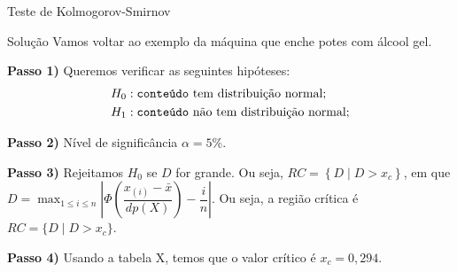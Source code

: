\documentclass[10pt]{beamer}
\begin{document}
%
%

\begin{frame}{Teste de Kolmogorov-Smirnov}

\begin{block}{Solução}
Vamos voltar ao exemplo da máquina que enche potes com álcool gel. 
	
	\textbf{Passo 1)} Queremos verificar as seguintes hipóteses:
	\begin{align*}
		&H_0: \mbox{\texttt{conteúdo} tem distribuição normal};\\
		&H_1: \mbox{\texttt{conteúdo} não tem distribuição normal};
	\end{align*}
	
	\textbf{Passo 2)} Nível de significância $\alpha = 5\%$.
	
	\textbf{Passo 3)} Rejeitamos $H_0$ se $D$ for grande. Ou seja, $RC = \left\{ D \mid D > x_c \right\}$, em que $D = \max_{1 \leq i \leq n} \left\lvert \Phi\left( \dfrac{x_{(i)} - \bar{x}}{dp(X)}  \right) - \dfrac{i}{n} \right\rvert$. Ou seja, a região crítica é $RC = \{D \mid D > x_c \}.$

	\textbf{Passo 4)} Usando a tabela X, temos que o valor crítico é $x_c = 0,294$.
\end{block}

\end{frame}
\end{document}
